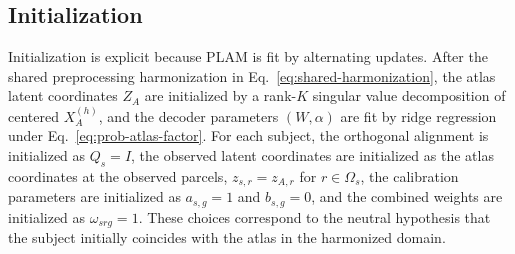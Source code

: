 \documentclass[11pt]{article}
\numberwithin{equation}{section}
\begin{document}
\subsection{Initialization}
Initialization is explicit because PLAM is fit by alternating
updates.  After the shared preprocessing harmonization in
Eq.~\eqref{eq:shared-harmonization}, the atlas latent coordinates $Z_A$ are
initialized by a rank-$K$ singular value decomposition of centered $X_A^{(h)}$, and
the decoder parameters $(W,\alpha)$ are fit by ridge regression under
Eq.~\eqref{eq:prob-atlas-factor}.  For each subject, the orthogonal alignment is
initialized as $Q_s=I$, the observed latent coordinates are initialized as the atlas
coordinates at the observed parcels, $z_{s,r}=z_{A,r}$ for $r\in\Omega_s$, the
calibration parameters are initialized as $a_{s,g}=1$ and $b_{s,g}=0$, and the
combined weights are initialized as $\omega_{srg}=1$.  These choices correspond to
the neutral hypothesis that the subject initially coincides with the atlas in the
harmonized domain.
\end{document}
